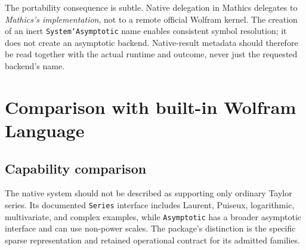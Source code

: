 \documentclass[11pt,a4paper]{article}
\newcommand{\code}[1]{\texttt{#1}}
\begin{document}
The portability consequence is subtle. Native delegation in Mathics delegates to \emph{Mathics's implementation}, not to a remote official Wolfram kernel. The creation of an inert \code{System`Asymptotic} name enables consistent symbol resolution; it does not create an asymptotic backend. Native-result metadata should therefore be read together with the actual runtime and outcome, never just the requested backend's name.\cite{mathicsguide,compat}

\section{Comparison with built-in Wolfram Language}
\subsection{Capability comparison}
The native system should not be described as supporting only ordinary Taylor series. Its documented \code{Series} interface includes Laurent, Puiseux, logarithmic, multivariate, and complex examples, while \code{Asymptotic} has a broader asymptotic interface and can use non-power scales. The package's distinction is the specific sparse representation and retained operational contract for its admitted families.\cite{wlseries,wlasymptotic}
\end{document}
